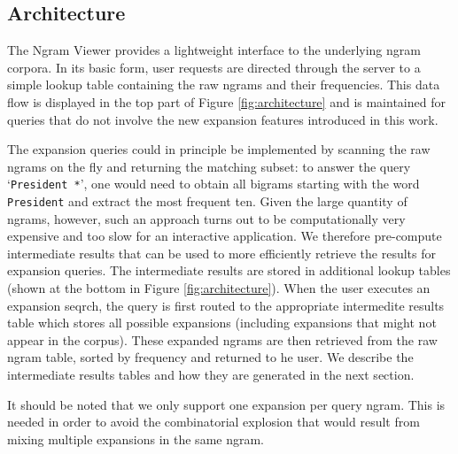 \documentclass[11pt,a4paper]{article}
\newcommand{\query}[1]{\texttt{#1}}
\begin{document}
\subsection{Architecture}
The Ngram Viewer provides a lightweight interface to the underlying ngram corpora. In its basic form, user requests are directed through the server to a simple lookup table containing the raw ngrams and their frequencies. This data flow is displayed in the top part of Figure \ref{fig:architecture} and is maintained for queries that do not involve the new expansion features introduced in this work.

The expansion queries could in principle be implemented by scanning the raw ngrams on the fly and returning the matching subset: to answer the query `\query{President *}', one would need to obtain all bigrams starting with the word \query{President} and extract the most frequent ten. Given the large quantity of ngrams, however, such an approach turns out to be computationally very expensive and too slow for an interactive application. We therefore pre-compute intermediate results that can be used to more efficiently retrieve the results for expansion queries. The intermediate results are stored in additional lookup tables (shown at the bottom in Figure \ref{fig:architecture}). When the user executes an expansion seqrch, the query is first routed to the appropriate intermedite results table which stores all possible expansions (including expansions that might not appear in the corpus).  These expanded ngrams are then retrieved from the raw ngram table, sorted by frequency and returned to he user.
We describe the intermediate results tables and how they are generated in the next section.

It should be noted that we only support one expansion per query ngram. This is needed in order to avoid the combinatorial explosion that would result from mixing multiple expansions in the same ngram.
\end{document}
